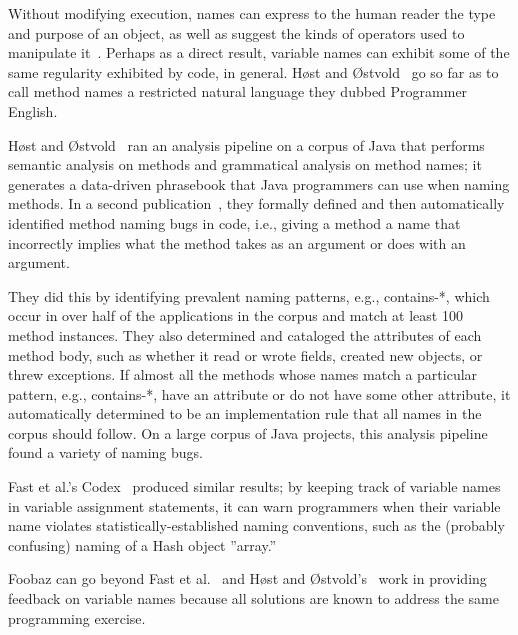Without modifying execution, names can express to the human reader the type and purpose of an object, as well as suggest the kinds of operators used to manipulate it~\cite{jones2008operand}. Perhaps as a direct result, variable names can exhibit some of the same regularity exhibited by code, in general. H{{\o{}}}st and {{\O{}}}stvold~\cite{host2008java} go so far as to call method names a restricted natural language they dubbed Programmer English.

H{{\o{}}}st and {{\O{}}}stvold~\cite{host2008java} ran an analysis pipeline on a corpus of Java that performs semantic analysis on methods and grammatical analysis on method names; it generates a data-driven phrasebook that Java programmers can use when naming methods. In a second publication~\cite{host2009debugging}, they formally defined and then automatically identified method naming bugs in code, i.e., giving a method a name that incorrectly implies what the method takes as an argument or does with an argument.

They did this by identifying prevalent naming patterns, e.g., contains-*, which occur in over half of the applications in the corpus and match at least 100 method instances. They also determined and cataloged the attributes of each method body, such as whether it read or wrote fields, created new objects, or threw exceptions. If almost all the methods whose names match a particular pattern, e.g., contains-*, have an attribute or do not have some other attribute, it automatically determined to be an implementation rule that all names in the corpus should follow. On a large corpus of Java projects, this analysis pipeline found a variety of naming bugs.

Fast et al.'s Codex~\cite{codex} produced similar results; by keeping track of variable names in variable assignment statements, it can warn programmers when their variable name violates statistically-established naming conventions, such as the (probably confusing) naming of a Hash object ''array.'' 

Foobaz can go beyond Fast et al.~\cite{codex} and H{{\o{}}}st and {{\O{}}}stvold's~\cite{host2008java,host2009debugging} work in providing feedback on variable names because all solutions are known to address the same programming exercise.

